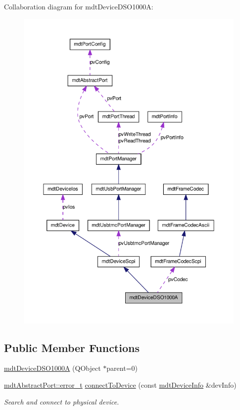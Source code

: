 Collaboration diagram for mdtDeviceDSO1000A:\nopagebreak
\begin{figure}[H]
\begin{center}
\leavevmode
\includegraphics[width=400pt]{classmdt_device_d_s_o1000_a__coll__graph}
\end{center}
\end{figure}
\subsection*{Public Member Functions}
\begin{DoxyCompactItemize}
\item 
\hyperlink{classmdt_device_d_s_o1000_a_a3c4cd1418250864589284a3540353fdb}{mdtDeviceDSO1000A} (QObject $\ast$parent=0)
\item 
\hyperlink{classmdt_abstract_port_ad4121bb930c95887e77f8bafa065a85e}{mdtAbstractPort::error\_\-t} \hyperlink{classmdt_device_d_s_o1000_a_a84431cf929750a8a25d5218893736c72}{connectToDevice} (const \hyperlink{classmdt_device_info}{mdtDeviceInfo} \&devInfo)
\begin{DoxyCompactList}\small\item\em Search and connect to physical device. \end{DoxyCompactList}\end{DoxyCompactItemize}


